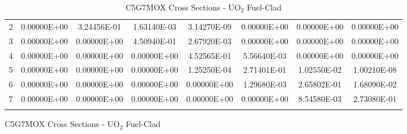 \begin{figure}
\begin{table}[H]
\begin{subtable}[h]{1.0\textwidth}
{\begin{tabular}{*8c}
2 & 0.00000E+00 & 3.24456E-01 & 1.63140E-03 & 3.14270E-09 & 0.00000E+00 & 0.00000E+00 & 0.00000E+00 \\
3 & 0.00000E+00 & 0.00000E+00 & 4.50940E-01 & 2.67920E-03 & 0.00000E+00 & 0.00000E+00 & 0.00000E+00 \\
4 & 0.00000E+00 & 0.00000E+00 & 0.00000E+00 & 4.52565E-01 & 5.56640E-03 & 0.00000E+00 & 0.00000E+00 \\
5 & 0.00000E+00 & 0.00000E+00 & 0.00000E+00 & 1.25250E-04 & 2.71401E-01 & 1.02550E-02 & 1.00210E-08 \\
6 & 0.00000E+00 & 0.00000E+00 & 0.00000E+00 & 0.00000E+00 & 1.29680E-03 & 2.65802E-01 & 1.68090E-02 \\
7 & 0.00000E+00 & 0.00000E+00 & 0.00000E+00 & 0.00000E+00 & 0.00000E+00 & 8.54580E-03 & 2.73080E-01 \\
        \bottomrule
        & & & & & & & 
    \end{tabular}}
  \end{subtable}
    \caption{C5G7MOX Cross Sections - UO$_{2}$ Fuel-Clad}
\end{table}
\end{figure}
